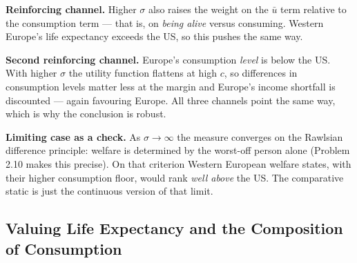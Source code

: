 \documentclass[12pt, letterpaper]{article}
\begin{document}
\begin{tcolorbox}[oddbox,title={Problem 2.9 \quad Risk Aversion and Welfare in Western Europe}]
\begin{enumerate}
\end{enumerate}

\textbf{Reinforcing channel.} Higher $\sigma$ also raises the weight on the $\bar u$ term
relative to the consumption term --- that is, on \emph{being alive} versus consuming.
Western Europe's life expectancy exceeds the US, so this pushes the same way.

\textbf{Second reinforcing channel.} Europe's consumption \emph{level} is below the US. With
higher $\sigma$ the utility function flattens at high $c$, so differences in consumption
levels matter less at the margin and Europe's income shortfall is discounted --- again
favouring Europe. All three channels point the same way, which is why the conclusion is
robust.

\medskip
\textbf{Limiting case as a check.} As $\sigma \to \infty$ the measure converges on the
Rawlsian difference principle: welfare is determined by the worst-off person alone
(Problem 2.10 makes this precise). On that criterion Western European welfare states, with
their higher consumption floor, would rank \emph{well above} the US. The comparative static
is just the continuous version of that limit. \checkmark
\end{tcolorbox}

\subsection{Valuing Life Expectancy and the Composition of Consumption}
\end{document}
